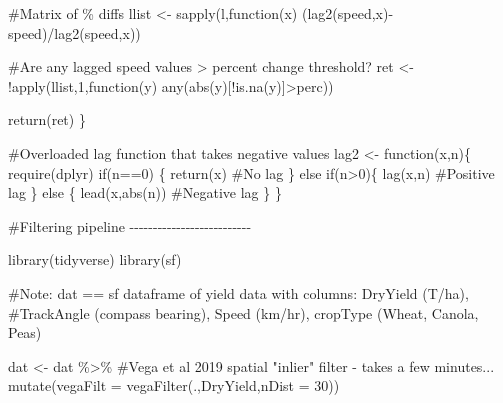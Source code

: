\documentclass[]{elsarticle} %
\newenvironment{Shaded}{}{}
\newcommand{\AttributeTok}[1]{#1}
\newcommand{\CommentTok}[1]{\textcolor[rgb]{0.00,0.50,0.00}{#1}}
\newcommand{\ControlFlowTok}[1]{\textcolor[rgb]{0.00,0.00,1.00}{#1}}
\newcommand{\DecValTok}[1]{#1}
\newcommand{\FunctionTok}[1]{#1}
\newcommand{\NormalTok}[1]{#1}
\newcommand{\OtherTok}[1]{\textcolor[rgb]{1.00,0.25,0.00}{#1}}
\newcommand{\SpecialCharTok}[1]{\textcolor[rgb]{0.00,0.50,0.50}{#1}}
\begin{document}
\begin{Shaded}
\begin{Highlighting}[]
  \CommentTok{\#Matrix of \% diffs}
\NormalTok{  llist }\OtherTok{\textless{}{-}} \FunctionTok{sapply}\NormalTok{(l,}\ControlFlowTok{function}\NormalTok{(x) (}\FunctionTok{lag2}\NormalTok{(speed,x)}\SpecialCharTok{{-}}\NormalTok{speed)}\SpecialCharTok{/}\FunctionTok{lag2}\NormalTok{(speed,x)) }
  
  \CommentTok{\#Are any lagged speed values \textgreater{} percent change threshold?}
\NormalTok{  ret }\OtherTok{\textless{}{-}} \SpecialCharTok{!}\FunctionTok{apply}\NormalTok{(llist,}\DecValTok{1}\NormalTok{,}\ControlFlowTok{function}\NormalTok{(y) }\FunctionTok{any}\NormalTok{(}\FunctionTok{abs}\NormalTok{(y)[}\SpecialCharTok{!}\FunctionTok{is.na}\NormalTok{(y)]}\SpecialCharTok{\textgreater{}}\NormalTok{perc))}
  
  \FunctionTok{return}\NormalTok{(ret)}
\NormalTok{\}}

\CommentTok{\#Overloaded lag function that takes negative values}
\NormalTok{lag2 }\OtherTok{\textless{}{-}} \ControlFlowTok{function}\NormalTok{(x,n)\{}
  \FunctionTok{require}\NormalTok{(dplyr)}
  \ControlFlowTok{if}\NormalTok{(n}\SpecialCharTok{==}\DecValTok{0}\NormalTok{) \{}
    \FunctionTok{return}\NormalTok{(x) }\CommentTok{\#No lag}
\NormalTok{  \} }\ControlFlowTok{else} \ControlFlowTok{if}\NormalTok{(n}\SpecialCharTok{\textgreater{}}\DecValTok{0}\NormalTok{)\{}
    \FunctionTok{lag}\NormalTok{(x,n) }\CommentTok{\#Positive lag}
\NormalTok{  \} }\ControlFlowTok{else}\NormalTok{ \{}
    \FunctionTok{lead}\NormalTok{(x,}\FunctionTok{abs}\NormalTok{(n)) }\CommentTok{\#Negative lag}
\NormalTok{  \} }
\NormalTok{\} }

\CommentTok{\#Filtering pipeline  {-}{-}{-}{-}{-}{-}{-}{-}{-}{-}{-}{-}{-}{-}{-}{-}{-}{-}{-}{-}{-}{-}{-}{-}{-}{-}}

\FunctionTok{library}\NormalTok{(tidyverse)}
\FunctionTok{library}\NormalTok{(sf)}

\CommentTok{\#Note: dat == sf dataframe of yield data with columns: DryYield (T/ha),}
\CommentTok{\#TrackAngle (compass bearing), Speed (km/hr), cropType (Wheat, Canola, Peas)}

\NormalTok{dat }\OtherTok{\textless{}{-}}\NormalTok{ dat }\SpecialCharTok{\%\textgreater{}\%} 
  \CommentTok{\#Vega et al 2019 spatial "inlier" filter {-} takes a few minutes...}
  \FunctionTok{mutate}\NormalTok{(}\AttributeTok{vegaFilt =} \FunctionTok{vegaFilter}\NormalTok{(.,DryYield,}\AttributeTok{nDist =} \DecValTok{30}\NormalTok{)) }


\end{Highlighting}
\end{Shaded}
\end{document}
